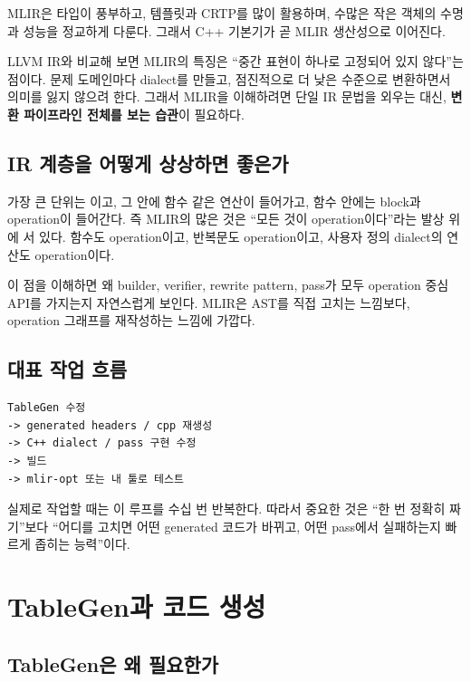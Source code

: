\documentclass[11pt,a4paper]{book}
\DeclareRobustCommand{\code}[1]{\texttt{\detokenize{#1}}}
\newcommand{\term}[1]{\textbf{#1}}
\begin{document}
\begin{conceptbox}[title={왜 MLIR이 C++과 잘 맞는가}]
MLIR은 타입이 풍부하고, 템플릿과 CRTP를 많이 활용하며, 수많은 작은 객체의 수명과 성능을 정교하게 다룬다. 그래서 C++ 기본기가 곧 MLIR 생산성으로 이어진다.
\end{conceptbox}

LLVM IR와 비교해 보면 MLIR의 특징은 ``중간 표현이 하나로 고정되어 있지 않다''는 점이다. 문제 도메인마다 dialect를 만들고, 점진적으로 더 낮은 수준으로 변환하면서 의미를 잃지 않으려 한다. 그래서 MLIR을 이해하려면 단일 IR 문법을 외우는 대신, \term{변환 파이프라인 전체를 보는 습관}이 필요하다.

\section{IR 계층을 어떻게 상상하면 좋은가}

가장 큰 단위는 \code{ModuleOp}이고, 그 안에 함수 같은 연산이 들어가고, 함수 안에는 block과 operation이 들어간다. 즉 MLIR의 많은 것은 ``모든 것이 operation이다''라는 발상 위에 서 있다. 함수도 operation이고, 반복문도 operation이고, 사용자 정의 dialect의 연산도 operation이다.

이 점을 이해하면 왜 builder, verifier, rewrite pattern, pass가 모두 operation 중심 API를 가지는지 자연스럽게 보인다. MLIR은 AST를 직접 고치는 느낌보다, operation 그래프를 재작성하는 느낌에 가깝다.

\section{대표 작업 흐름}

\begin{lstlisting}[style=shell,numbers=none,title={MLIR 개발의 반복 루프}]
TableGen 수정
-> generated headers / cpp 재생성
-> C++ dialect / pass 구현 수정
-> 빌드
-> mlir-opt 또는 내 툴로 테스트
\end{lstlisting}

실제로 작업할 때는 이 루프를 수십 번 반복한다. 따라서 중요한 것은 ``한 번 정확히 짜기''보다 ``어디를 고치면 어떤 generated 코드가 바뀌고, 어떤 pass에서 실패하는지 빠르게 좁히는 능력''이다.

\chapter{TableGen과 코드 생성}

\section{TableGen은 왜 필요한가}
\end{document}
